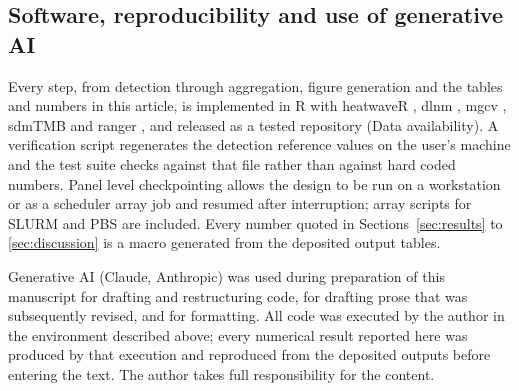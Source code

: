 \subsection{Software, reproducibility and use of generative AI}\label{sec:software}

Every step, from detection through aggregation, figure generation and the tables and numbers in this article, is implemented in R \citep[version \rVersion{};][]{rcore2024} with heatwaveR \heatwaveRVersion{}, dlnm \dlnmVersion{}, mgcv \mgcvVersion{}, sdmTMB \sdmtmbVersion{} and ranger \rangerVersion{}, and released as a tested repository (Data availability). A verification script regenerates the detection reference values on the user's machine and the test suite checks against that file rather than against hard coded numbers. Panel level checkpointing allows the design to be run on a workstation or as a scheduler array job and resumed after interruption; array scripts for SLURM and PBS are included. Every number quoted in Sections~\ref{sec:results} to \ref{sec:discussion} is a macro generated from the deposited output tables.

Generative AI (Claude, Anthropic) was used during preparation of this manuscript for drafting and restructuring code, for drafting prose that was subsequently revised, and for formatting. All code was executed by the author in the environment described above; every numerical result reported here was produced by that execution and reproduced from the deposited outputs before entering the text. The author takes full responsibility for the content.


